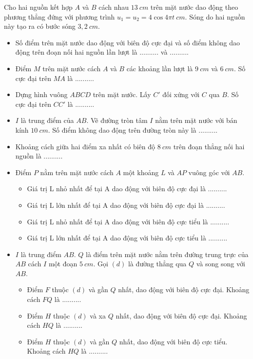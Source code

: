 \begin{vidu}%
Cho hai nguồn kết hợp $A$ và $B$ cách nhau $13\ cm$ trên mặt nước dao động theo phương thẳng đứng với phương trình $u_1=u_2=4\cos 4\pi t\ cm$. Sóng do hai nguồn này tạo ra có bước sóng $3,2\ cm$. 
\begin{itemize}
\item[1.] Số điểm trên mặt nước dao động với biên độ cực đại và số điểm không dao động trên đoạn nối hai nguồn lần lượt là .......... và ..........
\item[2.] Điểm $M$ trên mặt nước cách $A$ và $B$ các khoảng lần lượt là $9\ cm$ và $6\ cm$. Số cực đại trên $MA$ là ..........
\item[3.] Dựng hình vuông $ABCD$ trên mặt nước. Lấy $C'$ đối xứng với $C$ qua $B$. Số cực đại trên $CC'$ là ..........
\item[4.] $I$ là trung điểm của $AB$. Vẽ đường tròn tâm $I$ nằm trên mặt nước với bán kính $10\ cm$. Số điểm không dao động trên đường tròn này là .......... 
\item[5.] Khoảng cách giữa hai điểm xa nhất có biên độ $8\ cm$ trên đoạn thẳng nối hai nguồn là .......... 
\item[6.] Điểm $P$ nằm trên mặt nước cách $A$ một khoảng $L$ và $AP$ vuông góc với $AB$. 
\begin{itemize}
\item[a.] Giá trị L nhỏ nhất để tại A dao động với biên độ cực đại là ..........
\item[b.] Giá trị L lớn nhất để tại A dao động với biên độ cực đại là ..........
\item[c.] Giá trị L nhỏ nhất để tại A dao động với biên độ cực tiểu là ..........
\item[d.] Giá trị L lớn nhất để tại A dao động với biên độ cực tiểu là ..........
\end{itemize}
\item[7.]  $I$ là trung điểm $AB$. $Q$ là điểm trên mặt nước nằm trên đường trung trực của $AB$ cách $I$ một đoạn $5\ cm$. Gọi $(d)$ là đường thẳng qua $Q$ và song song với $AB$. 
\begin{itemize}
\item[a.] Điểm $F$ thuộc $(d)$ và gần $Q$ nhất, dao động với biên độ cực đại. Khoảng cách $FQ$ là ..........
\item[b.]  Điểm $H$ thuộc $(d)$ và xa $Q$ nhất, dao động với biên độ cực đại. Khoảng cách $HQ$ là ..........
\item[c.]  Điểm $H$ thuộc $(d)$ và gần $Q$ nhất, dao động với biên độ cực tiểu. Khoảng cách $HQ$ là ..........

\end{itemize}
\end{itemize}
\end{vidu}

